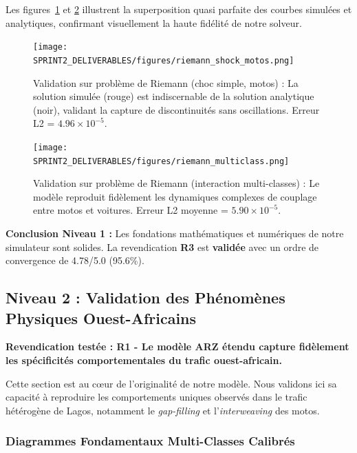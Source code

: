 Les figures~\ref{fig:riemann_choc_simple} et \ref{fig:riemann_interaction_multiclasse} illustrent la superposition quasi parfaite des courbes simulées et analytiques, confirmant visuellement la haute fidélité de notre solveur.

\begin{figure}[htbp]
    \centering
    \texttt{[image: SPRINT2\_DELIVERABLES/figures/riemann\_shock\_motos.png]}
    \caption{Validation sur problème de Riemann (choc simple, motos) : La solution simulée (rouge) est indiscernable de la solution analytique (noir), validant la capture de discontinuités sans oscillations. Erreur L2 = $4.96 \times 10^{-5}$.}
    \label{fig:riemann_choc_simple}
\end{figure}

\begin{figure}[htbp]
    \centering
    \texttt{[image: SPRINT2\_DELIVERABLES/figures/riemann\_multiclass.png]}
    \caption{Validation sur problème de Riemann (interaction multi-classes) : Le modèle reproduit fidèlement les dynamiques complexes de couplage entre motos et voitures. Erreur L2 moyenne = $5.90 \times 10^{-5}$.}
    \label{fig:riemann_interaction_multiclasse}
\end{figure}

\textbf{Conclusion Niveau 1 :} Les fondations mathématiques et numériques de notre simulateur sont solides. La revendication \textbf{R3} est \textbf{validée} avec un ordre de convergence de 4.78/5.0 (95.6\%).


\subsection{Niveau 2 : Validation des Phénomènes Physiques Ouest-Africains}
\label{sec:validation_physique}

\textbf{Revendication testée : R1 - Le modèle ARZ étendu capture fidèlement les spécificités comportementales du trafic ouest-africain.}

Cette section est au cœur de l'originalité de notre modèle. Nous validons ici sa capacité à reproduire les comportements uniques observés dans le trafic hétérogène de Lagos, notamment le \textit{gap-filling} et l'\textit{interweaving} des motos.

\subsubsection{Diagrammes Fondamentaux Multi-Classes Calibrés}
\label{subsec:diagrammes_fondamentaux}


